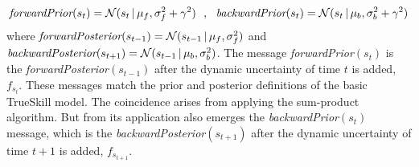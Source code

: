 \documentclass[article]{jss}
\newcommand{\N}{\mathcal{N}}
\begin{document}
%
\begin{equation} \label{eq:dynamic_history}
\begin{split}
\emph{forwardPrior}(s_t) = \N(s_t\,|\, \mu_f, \sigma_f^2 + \gamma^2)  \ \ , \ \  \emph{backwardPrior}(s_t) = \N(s_t\,|\, \mu_b, \sigma_b^2 + \gamma^2)
\end{split}
\end{equation}
%
where $\emph{forwardPosterior}(s_{t-1}) = \N(s_{t-1} \, | \, \mu_f, \sigma_f^2)$ and $\emph{backwardPosterior}(s_{t+1}) = \N(s_{t-1} \, | \, \mu_b, \sigma_b^2)$. 
The message \emph{forwardPrior}$(s_t)$ is the \emph{forwardPosterior}$(s_{t-1})$ after the dynamic uncertainty of time $t$ is added, $f_{s_t}$. 
These messages match the prior and posterior definitions of the basic TrueSkill model. 
The coincidence arises from applying the sum-product algorithm. 
But from its application also emerges the \emph{backwardPrior}$(s_t)$ message, which is the \emph{backwardPosterior}$(s_{t+1})$ after the dynamic uncertainty of time $t+1$ is added, $f_{s_{t+1}}$. 

%
%
\end{document}
